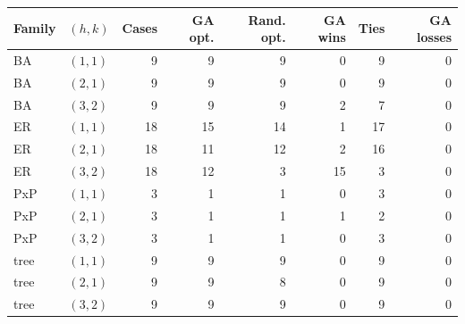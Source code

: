 \begin{tabular}{llrrrrrr}
\toprule
Family & $(h,k)$ & Cases & GA opt. & Rand. opt. & GA wins & Ties & GA losses\\
\midrule
BA & $(1,1)$ & 9 & 9 & 9 & 0 & 9 & 0\\
BA & $(2,1)$ & 9 & 9 & 9 & 0 & 9 & 0\\
BA & $(3,2)$ & 9 & 9 & 9 & 2 & 7 & 0\\
ER & $(1,1)$ & 18 & 15 & 14 & 1 & 17 & 0\\
ER & $(2,1)$ & 18 & 11 & 12 & 2 & 16 & 0\\
ER & $(3,2)$ & 18 & 12 & 3 & 15 & 3 & 0\\
PxP & $(1,1)$ & 3 & 1 & 1 & 0 & 3 & 0\\
PxP & $(2,1)$ & 3 & 1 & 1 & 1 & 2 & 0\\
PxP & $(3,2)$ & 3 & 1 & 1 & 0 & 3 & 0\\
tree & $(1,1)$ & 9 & 9 & 9 & 0 & 9 & 0\\
tree & $(2,1)$ & 9 & 9 & 8 & 0 & 9 & 0\\
tree & $(3,2)$ & 9 & 9 & 9 & 0 & 9 & 0\\
\bottomrule
\end{tabular}
